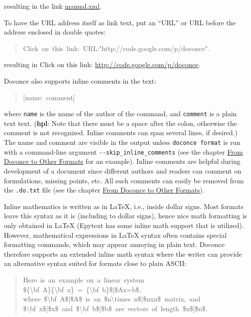 \documentclass[a4paper]{article}
\begin{document}


resulting in the link \url{manual.xml}.

To have the URL address itself as link text, put an ``URL'' or URL
before the address enclosed in double quotes:
%
\begin{quote}{\ttfamily \raggedright \noindent
Click~on~this~link:~URL:"http://code.google.com/p/doconce".
}
\end{quote}

resulting in Click on this link: \url{http://code.google.com/p/doconce}.

Doconce also supports inline comments in the text:
%
\begin{quote}{\ttfamily \raggedright \noindent
{[}name:~comment{]}
}
\end{quote}

where \texttt{name} is the name of the author of the command, and \texttt{comment} is a
plain text text. (\textbf{hpl}: Note that there must be a space after the colon,
otherwise the comment is not recognized. Inline comments
can span
several lines,
if desired.)
The name and comment are visible in the output unless \texttt{doconce format}
is run with a command-line argument \texttt{-{}-skip\_inline\_comments}
(see the chapter \hyperref[from-doconce-to-other-formats]{From Doconce to Other Formats} for an example). Inline comments
are helpful during development of a document since different authors
and readers can comment on formulations, missing points, etc.
All such comments can easily be removed from the \texttt{.do.txt} file
(see the chapter \hyperref[from-doconce-to-other-formats]{From Doconce to Other Formats}).

Inline mathematics is written as in LaTeX, i.e., inside dollar signs.
Most formats leave this syntax as it is (including to dollar signs),
hence nice math formatting is only obtained in LaTeX (Epytext has some
inline math support that is utilized).  However, mathematical
expressions in LaTeX syntax often contains special formatting
commands, which may appear annoying in plain text. Doconce therefore
supports an extended inline math syntax where the writer can provide
an alternative syntax suited for formats close to plain ASCII:
%
\begin{quote}{\ttfamily \raggedright \noindent
Here~is~an~example~on~a~linear~system\\
\$\{\textbackslash{}bf~A\}\{\textbackslash{}bf~x\}~=~\{\textbackslash{}bf~b\}\$|\$Ax=b\$,\\
where~\$\textbackslash{}bf~A\$|\$A\$~is~an~\$n\textbackslash{}times~n\$|\$nxn\$~matrix,~and\\
\$\textbackslash{}bf~x\$|\$x\$~and~\$\textbackslash{}bf~b\$|\$b\$~are~vectors~of~length~\$n\$|\$n\$.
}
\end{quote}
\end{document}
